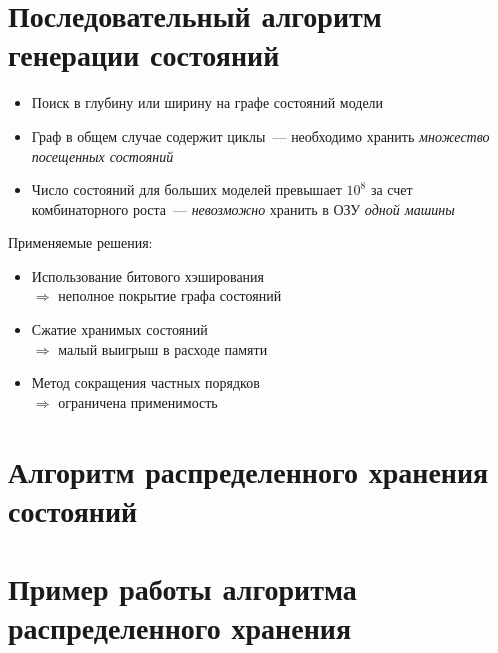 \documentclass[12pt]{article}
\begin{document}
\section{Последовательный алгоритм генерации состояний}
\label{sec:seq-stategen}

\small{
  \begin{itemize}
  \item Поиск в глубину или ширину на графе состояний модели
  \item Граф в общем случае содержит циклы~--- необходимо хранить \textit{множество посещенных состояний}
  \item Число состояний для больших моделей превышает $10^{8}$ за счет комбинаторного
    роста~--- \textit{невозможно} хранить в ОЗУ \textit{одной машины}
  \end{itemize}
  
  \begin{minipage}[t]{0.25\linewidth}
    \begin{flushright}
      Применяемые решения:
    \end{flushright}
  \end{minipage}
  \begin{minipage}[t]{0.7\linewidth}
    \begin{flushleft}
      \begin{itemize}
      \item Использование битового \mbox{хэширования} \\ $\Rightarrow$ неполное покрытие графа состояний
      \item Сжатие хранимых состояний \\ $\Rightarrow$ малый выигрыш в расходе памяти
      \item Метод сокращения частных порядков \\ $\Rightarrow$ ограничена применимость
      \end{itemize}
    \end{flushleft}
  \end{minipage}
}

\section{Алгоритм распределенного хранения состояний}
\label{sec:distr-storage}



\section{Пример работы алгоритма распределенного хранения}
\label{sec:distr-storage2}
\end{document}
